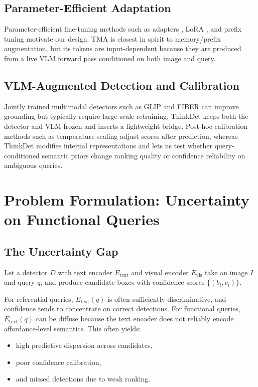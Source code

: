 \documentclass{uai2026} %
\begin{document}
\subsection{Parameter-Efficient Adaptation}
Parameter-efficient fine-tuning methods such as adapters \citep{houlsby2019adapter}, LoRA \citep{lora2022}, and prefix tuning \citep{prefix2021} motivate our design. TMA is closest in spirit to memory/prefix augmentation, but its tokens are input-dependent because they are produced from a live VLM forward pass conditioned on both image and query.

\subsection{VLM-Augmented Detection and Calibration}
Jointly trained multimodal detectors such as GLIP \citep{glip2022} and FIBER \citep{fiber2022} can improve grounding but typically require large-scale retraining. ThinkDet keeps both the detector and VLM frozen and inserts a lightweight bridge. Post-hoc calibration methods such as temperature scaling \citep{guo2017calibration} adjust scores after prediction, whereas ThinkDet modifies internal representations and lets us test whether query-conditioned semantic priors change ranking quality or confidence reliability on ambiguous queries.

\section{Problem Formulation: Uncertainty on Functional Queries}\label{sec:problem}
\subsection{The Uncertainty Gap}
Let a detector \(D\) with text encoder \(E_{\text{text}}\) and visual encoder \(E_{\text{vis}}\) take an image \(I\) and query \(q\), and produce candidate boxes with confidence scores \(\{(b_i, c_i)\}\).

For referential queries, \(E_{\text{text}}(q)\) is often sufficiently discriminative, and confidence tends to concentrate on correct detections. For functional queries, \(E_{\text{text}}(q)\) can be diffuse because the text encoder does not reliably encode affordance-level semantics. This often yields:
\begin{itemize}
\item high predictive dispersion across candidates,
\item poor confidence calibration,
\item and missed detections due to weak ranking.
\end{itemize}
\end{document}
